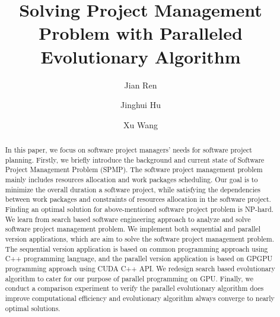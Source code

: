 

%
\title{Solving Project Management Problem with Paralleled Evolutionary Algorithm}
%
%
\author{Jian Ren \and Jinghui Hu \and Xu Wang}
%
%
%

\maketitle

\begin{abstract}
In this paper, we focus on software project managers’ needs for
software project planning. Firstly, we briefly introduce
the background and current state of Software Project Management Problem (SPMP).
The software project management problem mainly includes resources allocation
and work packages scheduling. Our goal is to minimize the overall duration a software
project, while satisfying the dependencies between work packages and constraints of resources
allocation in the software project. Finding an optimal solution for above-mentioned software
project problem is NP-hard. We learn from search based software engineering approach to
analyze and solve software project management problem. We implement both sequential and
parallel version applications, which are aim to solve the software project management
problem. The sequential version application is based on common programming approach using
C++ programming language, and the parallel version application is based on GPGPU programming
approach using CUDA C++ API. We redesign search based evolutionary algorithm to cater for our
purpose of parallel programming on GPU. Finally, we conduct a comparison experiment to verify
the parallel evolutionary algorithm does improve computational efficiency and evolutionary
algorithm always converge to nearly optimal solutions. 
\end{abstract}
